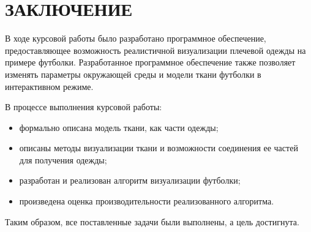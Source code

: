 \chapter*{ЗАКЛЮЧЕНИЕ}

В ходе курсовой работы было разработано программное обеспечение,
предоставляющее возможность реалистичной визуализации плечевой одежды на
примере футболки. Разработанное программное обеспечение также позволяет
изменять параметры окружающей среды и модели ткани футболки в интерактивном
режиме.

В процессе выполнения курсовой работы:
\begin{itemize}
    \item формально описана модель ткани, как части одежды;
    \item описаны методы визуализации ткани и возможности соединения ее частей
        для получения одежды;
    \item  разработан и реализован алгоритм визуализации футболки;
    \item произведена оценка производительности реализованного
        алгоритма.
\end{itemize}

Таким образом, все поставленные задачи были выполнены, а цель достигнута.
